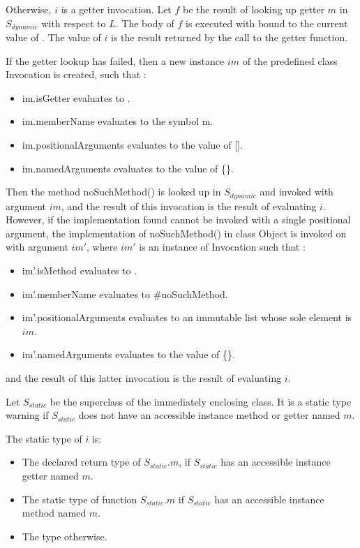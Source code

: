\documentclass{article}
\newcommand{\code}[1]{{\sf #1}}
\begin{document}
\LMHash{}
 Otherwise, $i$ is a getter invocation.  Let $f$ be the result of  looking up getter $m$ in $S_{dynamic}$  with respect to $L$.  The body of $f$  is executed with \THIS{} bound to the current value of  \THIS{}.  The value of $i$ is the result returned by the call to the getter function. 

\LMHash{}
If the getter lookup has failed, then a new instance $im$  of the predefined class  \code{Invocation}  is created, such that :
\begin{itemize}
\item  \code{im.isGetter} evaluates to \code{\TRUE{}}.
\item  \code{im.memberName} evaluates to the symbol \code{m}.
\item \code{im.positionalArguments} evaluates to the value of \code{\CONST{} []}.
\item \code{im.namedArguments} evaluates to the value of \code{\CONST{} \{\}}.
\end{itemize}
Then the method \code{noSuchMethod()} is looked up in $S_{dynamic}$ and invoked  with argument $im$, and the result of this invocation is the result of evaluating $i$. However, if the implementation found cannot be invoked with a single positional argument, the implementation  of \code{noSuchMethod()} in class \code{Object} is invoked on \THIS{} with argument $im'$, where $im'$ is an instance of \code{Invocation} such that :
\begin{itemize}
\item  \code{im'.isMethod} evaluates to \code{\TRUE{}}.
\item  \code{im'.memberName} evaluates to \code{\#noSuchMethod}.
\item \code{im'.positionalArguments} evaluates to an immutable list whose sole element is  $im$.
\item \code{im'.namedArguments} evaluates to the value of \code{\CONST{} \{\}}.
\end{itemize}
and the result of this latter invocation is the result of evaluating $i$.

\LMHash{}
Let $S_{static}$ be the superclass of the immediately enclosing class. It is a static type warning if $S_{static}$ does not have an accessible instance method or getter named $m$.  

The static type of $i$ is:
\begin{itemize}
\item The declared return type of $S_{static}.m$, if $S_{static}$ has an accessible instance getter named $m$.
\item The static type of function $S_{static}.m$ if $S_{static}$ has an accessible instance method named $m$.
\item The type  \DYNAMIC{} otherwise. 
\end{itemize}
\end{document}
